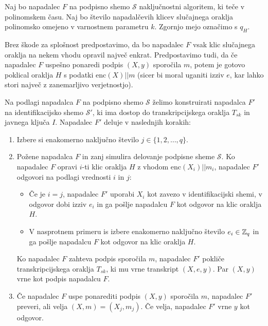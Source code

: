 \begin{dokaz}
    Naj bo napadalec $F$ na podpisno shemo $\mathcal{S}$ naključnostni algoritem, ki teče v
    polinomskem času. Naj bo število napadalčevih klicev slučajnega oraklja polinomsko omejeno
    v varnostnem parametru $k$. Zgornjo mejo označimo s $q_H$.

    Brez škode za splošnost predpostavimo, da bo napadalec $F$ vsak klic slučajnega oraklja na
    nekem vhodu opravil največ enkrat. Predpostavimo tudi, da če napadalec $F$ uspešno ponaredi
    podpis $(X, y)$ sporočila $m$, potem je gotovo poklical oraklja $H$ s podatki $\text{enc}(X) || m$
    (sicer bi moral uganiti izziv $e$, kar lahko stori največ z zanemarljivo verjetnostjo).

    Na podlagi napadalca $F$ na podpisno shemo $\mathcal{S}$ želimo konstruirati napadalca $F'$
    na identifikacijsko shemo $\mathcal{S'}$, ki ima dostop do transkripcijskega oraklja $T_{sk}$
    in javnega ključa $I$. Napadalec $F'$ deluje v naslednjih korakih:
    \begin{enumerate}
        \item Izbere si enakomerno naključno število $j \in \{1, 2, \dots, q\}$.
        \item Požene napadalca $F$ in zanj simulira delovanje podpisne sheme $\mathcal{S}$.
            Ko napadalec $F$ opravi $i$-ti klic oraklja $H$ z vhodom $\text{enc}(X_i) || m_i$,
            napadalec $F'$ odgovori na podlagi vrednosti $i$ in $j$:
            \begin{itemize}
                \item Če je $i = j$, napadalec $F'$ uporabi $X_i$ kot zavezo v identifikacijski
                    shemi, v odgovor dobi izziv $e_i$ in ga pošlje napadalcu $F$ kot odgovor na
                    klic oraklja $H$.
                \item V nasprotnem primeru is izbere enakomerno naključno število $e_i \in \mathbb Z_q$ in ga
                    pošlje napadalcu $F$ kot odgovor na klic oraklja $H$.
            \end{itemize}
            Ko napadalec $F$ zahteva podpis sporočila $m$, napadalec $F'$ pokliče transkripcijskega
            oraklja $T_{sk}$, ki mu vrne transkript $(X, e, y)$. Par $(X, y)$ vrne kot podpis
            napadalcu $F$.
        \label{step:simulate}
        \item Če napadalec $F$ uspe ponarediti podpis $(X, y)$ sporočila $m$, napadalec $F'$ preveri,
            ali velja $(X, m) = (X_j, m_j)$. Če velja, napadalec $F'$ vrne $y$ kot odgovor.

\end{enumerate}
\end{dokaz}
